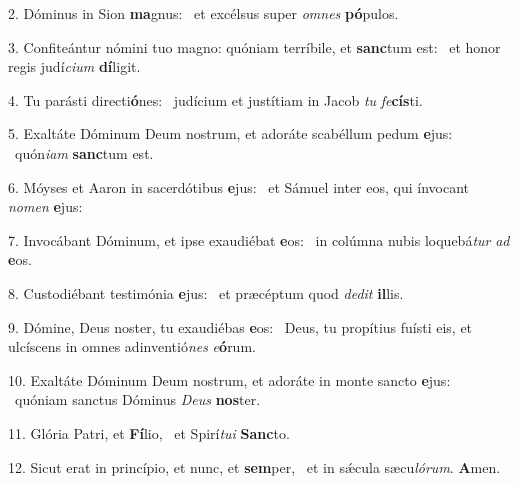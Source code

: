 2. Dóminus in Sion \textbf{ma}gnus: \ast\  et excélsus super \textit{om}\textit{nes} \textbf{pó}pulos.\

3. Confiteántur nómini tuo magno: quóniam terríbile, et \textbf{sanc}tum est: \ast\  et honor regis judí\textit{ci}\textit{um} \textbf{dí}ligit.\

4. Tu parásti directi\textbf{ó}nes: \ast\  judícium et justítiam in Jacob \textit{tu} \textit{fe}\textbf{cís}ti.\

5. Exaltáte Dóminum Deum nostrum, et adoráte scabéllum pedum \textbf{e}jus: \ast\  quón\textit{i}\textit{am} \textbf{sanc}tum est.\

6. Móyses et Aaron in sacerdótibus \textbf{e}jus: \ast\  et Sámuel inter eos, qui ínvocant \textit{no}\textit{men} \textbf{e}jus:\

7. Invocábant Dóminum, et ipse exaudiébat \textbf{e}os: \ast\  in colúmna nubis loquebá\textit{tur} \textit{ad} \textbf{e}os.\

8. Custodiébant testimónia \textbf{e}jus: \ast\  et præcéptum quod \textit{de}\textit{dit} \textbf{il}lis.\

9. Dómine, Deus noster, tu exaudiébas \textbf{e}os: \ast\  Deus, tu propítius fuísti eis, et ulcíscens in omnes adinventió\textit{nes} \textit{e}\textbf{ó}rum.\

10. Exaltáte Dóminum Deum nostrum, et adoráte in monte sancto \textbf{e}jus: \ast\  quóniam sanctus Dóminus \textit{De}\textit{us} \textbf{nos}ter.\

11. Glória Patri, et \textbf{Fí}lio, \ast\  et Spirí\textit{tu}\textit{i} \textbf{Sanc}to.\

12. Sicut erat in princípio, et nunc, et \textbf{sem}per, \ast\  et in sǽcula sæcu\textit{ló}\textit{rum}. \textbf{A}men.\

